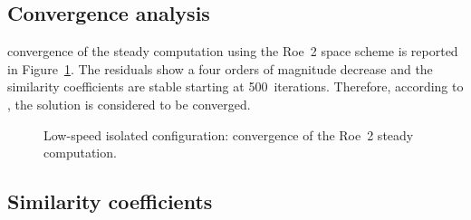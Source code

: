 
\subsection{Convergence analysis}
\label{sub:dream_ls_conv_coeff}

 convergence of the steady computation using the Roe~2 space scheme
is reported in Figure~\ref{fig:dream_ls_convergence_roe2}. The residuals
show a four orders of magnitude decrease and the similarity
coefficients are stable starting at 500~iterations.
Therefore, according to \citet{Casey2000}, the
solution is considered to be converged.
\begin{figure}[htp]
  \centering
  \caption{Low-speed isolated configuration: convergence of the Roe~2 steady
  computation.}
  \label{fig:dream_ls_convergence_roe2}
\end{figure}

\subsection{Similarity coefficients}
\label{sub:dream_ls_sim_coeff}

